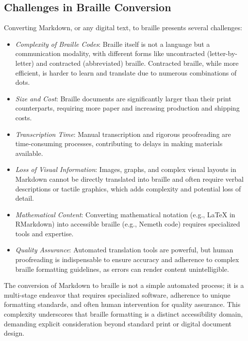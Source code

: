 \subsection{Challenges in Braille Conversion}
Converting Markdown, or any digital text, to braille presents several challenges:
\begin{itemize}
    \item \emph{Complexity of Braille Codes}: Braille itself is not a language but a communication modality, with different forms like uncontracted (letter-by-letter) and contracted (abbreviated) braille. \cite{InclusiveASL, TextToBraille} Contracted braille, while more efficient, is harder to learn and translate due to numerous combinations of dots. \cite{TextToBraille}
    \item \emph{Size and Cost}: Braille documents are significantly larger than their print counterparts, requiring more paper and increasing production and shipping costs. \cite{TextToBraille}
    \item \emph{Transcription Time}: Manual transcription and rigorous proofreading are time-consuming processes, contributing to delays in making materials available. \cite{BrailleProcess, TextToBraille}
    \item \emph{Loss of Visual Information}: Images, graphs, and complex visual layouts in Markdown cannot be directly translated into braille and often require verbal descriptions or tactile graphics, which adds complexity and potential loss of detail. \cite{InclusiveASL, TextToBraille, BRLFormat}
    \item \emph{Mathematical Content}: Converting mathematical notation (e.g., LaTeX in RMarkdown) into accessible braille (e.g., Nemeth code) requires specialized tools and expertise. \cite{BrailleBlaster}
    \item \emph{Quality Assurance}: Automated translation tools are powerful, but human proofreading is indispensable to ensure accuracy and adherence to complex braille formatting guidelines, as errors can render content unintelligible. \cite{BrailleProcess}
\end{itemize}
The conversion of Markdown to braille is not a simple automated process; it is a multi-stage endeavor that requires specialized software, adherence to unique formatting standards, and often human intervention for quality assurance. This complexity underscores that braille formatting is a distinct accessibility domain, demanding explicit consideration beyond standard print or digital document design.

